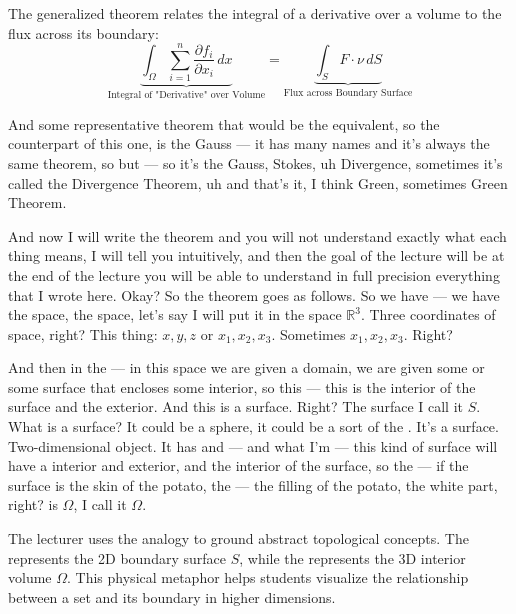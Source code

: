 \begin{math-stroke}
\begin{center}
\end{center}

The generalized theorem relates the integral of a derivative over a volume to the flux across its boundary:
\begin{equation} \label{eq:ftc_nd}
\underbrace{\int_{\Omega} \sum_{i=1}^n \frac{\partial f_i}{\partial x_i} \, dx}_{\text{Integral of "Derivative" over Volume}} = \underbrace{\int_{S} F \cdot \nu \, dS}_{\text{Flux across Boundary Surface}}
\end{equation}
\end{math-stroke}

\begin{spoken-clean}[00:06:23 - 00:07:45]
And some representative theorem that would be the equivalent, so the counterpart of this one, is the Gauss --- it has many names and it's always the same theorem, so but --- so it's the Gauss, Stokes, uh Divergence, sometimes it's called the Divergence Theorem, uh and that's it, I think Green, sometimes Green Theorem. 

And now I will write the theorem and you will not understand exactly what each thing means, I will tell you intuitively, and then the goal of the lecture will be at the end of the lecture you will be able to understand in full precision everything that I wrote here. Okay? So the theorem goes as follows. So we have --- we have the space, the space, let's say I will put it in the space $\mathbb{R}^3$. Three coordinates of space, right? This thing: $x, y, z$ or $x_1, x_2, x_3$. Sometimes $x_1, x_2, x_3$. Right? 

And then in the --- in this space we are given a domain, we are given some or some surface that encloses some interior, so this --- this is the interior of the surface and the exterior. And this is a surface. Right? The surface I call it $S$. What is a surface? It could be a sphere, it could be a sort of the . It's a surface. Two-dimensional object. It has and --- and what I'm --- this kind of surface will have a interior and exterior, and the interior of the surface, so the --- if the surface is the skin of the potato, the --- the filling of the potato, the white part, right? is $\Omega$, I call it $\Omega$.
\end{spoken-clean}

\begin{didactic-insight}
The lecturer uses the  analogy to ground abstract topological concepts. The  represents the 2D boundary surface $S$, while the  represents the 3D interior volume $\Omega$. This physical metaphor helps students visualize the relationship between a set and its boundary in higher dimensions.
\end{didactic-insight}

